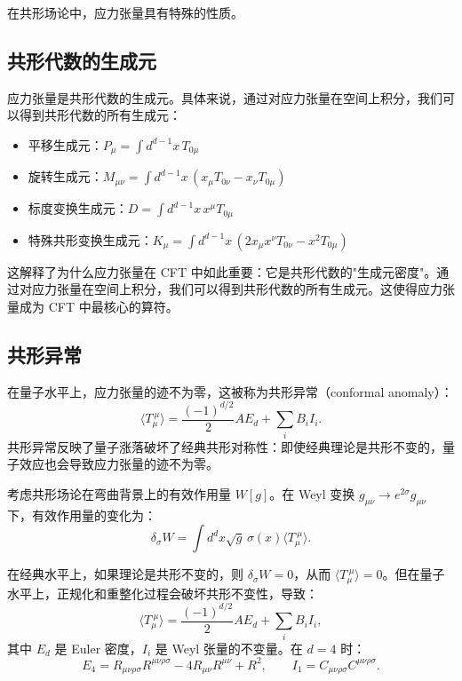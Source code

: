 在共形场论中，应力张量具有特殊的性质。

\subsection{共形代数的生成元}

应力张量是共形代数的生成元。具体来说，通过对应力张量在空间上积分，我们可以得到共形代数的所有生成元：
\begin{itemize}
    \item 平移生成元：$P_\mu = \int d^{d-1}x \, T_{0\mu}$
    \item 旋转生成元：$M_{\mu\nu} = \int d^{d-1}x \, (x_\mu T_{0\nu} - x_\nu T_{0\mu})$
    \item 标度变换生成元：$D = \int d^{d-1}x \, x^\mu T_{0\mu}$
    \item 特殊共形变换生成元：$K_\mu = \int d^{d-1}x \, (2x_\mu x^\nu T_{0\nu} - x^2 T_{0\mu})$
\end{itemize}

\begin{note}
这解释了为什么应力张量在 CFT 中如此重要：它是共形代数的"生成元密度"。通过对应力张量在空间上积分，我们可以得到共形代数的所有生成元。这使得应力张量成为 CFT 中最核心的算符。
\end{note}

\subsection{共形异常}

在量子水平上，应力张量的迹不为零，这被称为共形异常（conformal anomaly）：
\begin{equation}
    \langle T_\mu^{~\mu} \rangle = \frac{(-1)^{d/2}}{2} A E_d + \sum_i B_i I_i.
\end{equation}
共形异常反映了量子涨落破坏了经典共形对称性：即使经典理论是共形不变的，量子效应也会导致应力张量的迹不为零。

\begin{theorem}[共形异常的推导]
考虑共形场论在弯曲背景上的有效作用量 $W[g]$。在 Weyl 变换 $g_{\mu\nu} \to e^{2\sigma} g_{\mu\nu}$ 下，有效作用量的变化为：
\begin{equation}
    \delta_\sigma W = \int d^d x \sqrt{g} \, \sigma(x) \langle T_\mu^{~\mu} \rangle.
\end{equation}

在经典水平上，如果理论是共形不变的，则 $\delta_\sigma W = 0$，从而 $\langle T_\mu^{~\mu} \rangle = 0$。但在量子水平上，正规化和重整化过程会破坏共形不变性，导致：
\begin{equation}
    \langle T_\mu^{~\mu} \rangle = \frac{(-1)^{d/2}}{2} A E_d + \sum_i B_i I_i,
\end{equation}
其中 $E_d$ 是 Euler 密度，$I_i$ 是 Weyl 张量的不变量。在 $d=4$ 时：
\begin{equation}
    E_4 = R_{\mu\nu\rho\sigma} R^{\mu\nu\rho\sigma} - 4 R_{\mu\nu} R^{\mu\nu} + R^2, \qquad I_1 = C_{\mu\nu\rho\sigma} C^{\mu\nu\rho\sigma}.
\end{equation}
\end{theorem}

